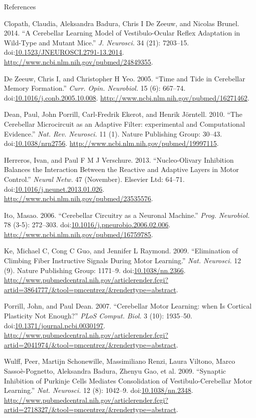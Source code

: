 \documentclass[ignorenonframetext,]{beamer}
\begin{document}
\begin{frame}{References}

Clopath, Claudia, Aleksandra Badura, Chris I {De Zeeuw}, and Nicolas
Brunel. 2014. ``A Cerebellar Learning Model of Vestibulo-Ocular Reflex
Adaptation in Wild-Type and Mutant Mice.'' \emph{J. Neurosci.} 34 (21):
7203--15.
doi:\href{http://dx.doi.org/10.1523/JNEUROSCI.2791-13.2014}{10.1523/JNEUROSCI.2791-13.2014}.
\url{http://www.ncbi.nlm.nih.gov/pubmed/24849355}.

{De Zeeuw}, Chris I, and Christopher H Yeo. 2005. ``Time and Tide in
Cerebellar Memory Formation.'' \emph{Curr. Opin. Neurobiol.} 15 (6):
667--74.
doi:\href{http://dx.doi.org/10.1016/j.conb.2005.10.008}{10.1016/j.conb.2005.10.008}.
\url{http://www.ncbi.nlm.nih.gov/pubmed/16271462}.

Dean, Paul, John Porrill, Carl-Fredrik Ekerot, and Henrik Jörntell.
2010. ``The Cerebellar Microcircuit as an Adaptive Filter: experimental
and Computational Evidence.'' \emph{Nat. Rev. Neurosci.} 11 (1). Nature
Publishing Group: 30--43.
doi:\href{http://dx.doi.org/10.1038/nrn2756}{10.1038/nrn2756}.
\url{http://www.ncbi.nlm.nih.gov/pubmed/19997115}.

Herreros, Ivan, and Paul F M J Verschure. 2013. ``Nucleo-Olivary
Inhibition Balances the Interaction Between the Reactive and Adaptive
Layers in Motor Control.'' \emph{Neural Netw.} 47 (November). Elsevier
Ltd: 64--71.
doi:\href{http://dx.doi.org/10.1016/j.neunet.2013.01.026}{10.1016/j.neunet.2013.01.026}.
\url{http://www.ncbi.nlm.nih.gov/pubmed/23535576}.

Ito, Masao. 2006. ``Cerebellar Circuitry as a Neuronal Machine.''
\emph{Prog. Neurobiol.} 78 (3-5): 272--303.
doi:\href{http://dx.doi.org/10.1016/j.pneurobio.2006.02.006}{10.1016/j.pneurobio.2006.02.006}.
\url{http://www.ncbi.nlm.nih.gov/pubmed/16759785}.

Ke, Michael C, Cong C Guo, and Jennifer L Raymond. 2009. ``Elimination
of Climbing Fiber Instructive Signals During Motor Learning.''
\emph{Nat. Neurosci.} 12 (9). Nature Publishing Group: 1171--9.
doi:\href{http://dx.doi.org/10.1038/nn.2366}{10.1038/nn.2366}.
\url{http://www.pubmedcentral.nih.gov/articlerender.fcgi?artid=3864777/\&tool=pmcentrez/\&rendertype=abstract}.

Porrill, John, and Paul Dean. 2007. ``Cerebellar Motor Learning: when Is
Cortical Plasticity Not Enough?'' \emph{PLoS Comput. Biol.} 3 (10):
1935--50.
doi:\href{http://dx.doi.org/10.1371/journal.pcbi.0030197}{10.1371/journal.pcbi.0030197}.
\url{http://www.pubmedcentral.nih.gov/articlerender.fcgi?artid=2041974/\&tool=pmcentrez/\&rendertype=abstract}.

Wulff, Peer, Martijn Schonewille, Massimiliano Renzi, Laura Viltono,
Marco Sassoè-Pognetto, Aleksandra Badura, Zhenyu Gao, et al. 2009.
``Synaptic Inhibition of Purkinje Cells Mediates Consolidation of
Vestibulo-Cerebellar Motor Learning.'' \emph{Nat. Neurosci.} 12 (8):
1042--9. doi:\href{http://dx.doi.org/10.1038/nn.2348}{10.1038/nn.2348}.
\url{http://www.pubmedcentral.nih.gov/articlerender.fcgi?artid=2718327/\&tool=pmcentrez/\&rendertype=abstract}.

\end{frame}
\end{document}
